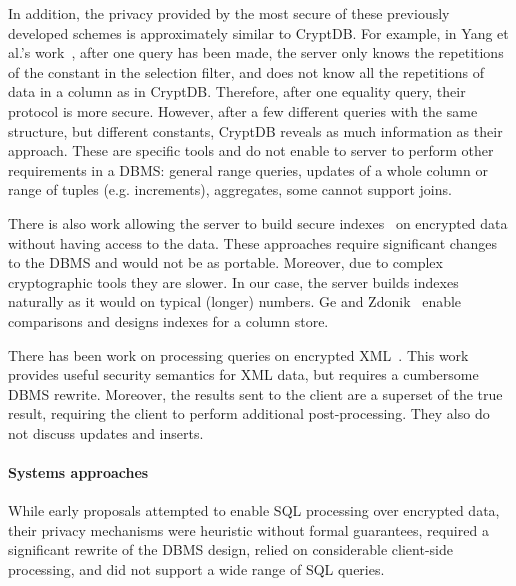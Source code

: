 In addition, the privacy provided by the most secure of these
previously developed schemes is approximately similar to CryptDB\@.  For
example, in Yang et al.'s work~\cite{Yang-privacy-preserving-queries},
after one query has been made, the server only knows the repetitions
of the constant in the selection filter, and does not know all the
repetitions of data in a column as in CryptDB\@.  Therefore, after one
equality query, their protocol is more secure. However, after a few
different queries with the same structure, but different constants,
CryptDB reveals as much information as their approach. These are
specific tools and do not enable to server to perform other
requirements in a DBMS: general range queries, updates of a whole
column or range of tuples (e.g. increments), aggregates, some cannot
support joins.

There is also work allowing the server to build secure
indexes~\cite{goh03} on encrypted data without having access to the
data. These approaches require significant changes to the DBMS and would not be
as portable. Moreover, due to complex cryptographic tools they are
slower. In our case, the server builds indexes naturally as it would
on typical (longer) numbers. Ge and Zdonik~\cite{c-store-index} enable
comparisons and designs indexes for a column store.

There has been work on processing queries on encrypted
XML~\cite{Wang-xml, querying-encrypted-XML}. This work provides useful
security semantics for XML data, but requires a cumbersome DBMS
rewrite.
Moreover, the results sent to the client are a superset of the true
result, requiring the client to perform additional post-processing.
They also do not discuss updates and inserts.

\vspace{-0.2cm}
\paragraph{Systems approaches} 

While early proposals attempted to enable SQL processing over
encrypted data, their privacy mechanisms were
heuristic without formal guarantees, required a significant rewrite of the DBMS
design, relied on considerable client-side processing, and did not support a
wide range of SQL queries.

